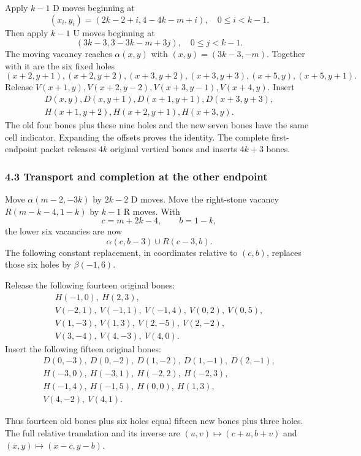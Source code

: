 \documentclass[
  10pt,
]{article}
\begin{document}
Apply \(k-1\) D moves beginning at \[
(x_i,y_i)=(2k-2+i,4-4k-m+i),\quad 0\le i<k-1.
\] Then apply \(k-1\) U moves beginning at \[
(3k-3,3-3k-m+3j),\quad0\le j<k-1.
\] The moving vacancy reaches \(\alpha(x,y)\) with \((x,y)=(3k-3,-m)\).
Together with it are the six fixed holes \[
(x+2,y+1),(x+2,y+2),(x+3,y+2),(x+3,y+3),(x+5,y),(x+5,y+1).
\] Release \(V(x+1,y),V(x+2,y-2),V(x+3,y-1),V(x+4,y)\). Insert \[
\begin{gathered}
D(x,y),D(x,y+1),D(x+1,y+1),D(x+3,y+3),\\
H(x+1,y+2),H(x+2,y+1),H(x+3,y).
\end{gathered}
\] The old four bones plus these nine holes and the new seven bones have
the same cell indicator. Expanding the offsets proves the identity. The
complete first-endpoint packet releases \(4k\) original vertical bones
and inserts \(4k+3\) bones.

\subsubsection{4.3 Transport and completion at the other
endpoint}\label{transport-and-completion-at-the-other-endpoint}

Move \(\alpha(m-2,-3k)\) by \(2k-2\) D moves. Move the right-stone
vacancy \(R(m-k-4,1-k)\) by \(k-1\) R moves. With \[
c=m+2k-4,\qquad b=1-k,
\] the lower six vacancies are now \[
\alpha(c,b-3)\cup R(c-3,b).
\] The following constant replacement, in coordinates relative to
\((c,b)\), replaces those six holes by \(\beta(-1,6)\).

Release the following fourteen original bones: \[
\begin{gathered}
H(-1,0),\ H(2,3),\\
V(-2,1),\ V(-1,1),\ V(-1,4),\ V(0,2),\ V(0,5),\\
V(1,-3),\ V(1,3),\ V(2,-5),\ V(2,-2),\\
V(3,-4),\ V(4,-3),\ V(4,0).
\end{gathered}
\] Insert the following fifteen original bones: \[
\begin{gathered}
D(0,-3),\ D(0,-2),\ D(1,-2),\ D(1,-1),\ D(2,-1),\\
H(-3,0),\ H(-3,1),\ H(-2,2),\ H(-2,3),\\
H(-1,4),\ H(-1,5),\ H(0,0),\ H(1,3),\\
V(4,-2),\ V(4,1).
\end{gathered}
\]

Thus fourteen old bones plus six holes equal fifteen new bones plus
three holes. The full relative translation and its inverse are
\((u,v)\mapsto(c+u,b+v)\) and \((x,y)\mapsto(x-c,y-b)\).
\end{document}
